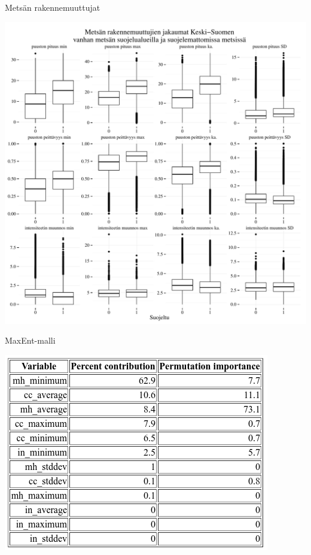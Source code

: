 \documentclass{beamer}
\begin{document}
\begin{frame}{Metsän rakennemuuttujat}
  \begin{center}
    \includegraphics[height=0.9\textheight]{metsamuuttujien_jakaumat.pdf}
  \end{center}
\end{frame}

\begin{frame}{MaxEnt-malli}
  \begin{center}
    \includegraphics[height=0.9\textheight]{maxent.png}
  \end{center}
\end{frame}
\end{document}
